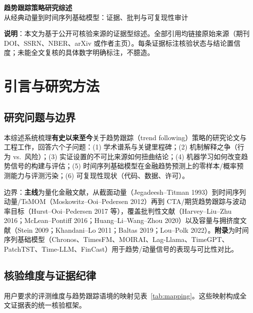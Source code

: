 \documentclass[11pt,a4paper]{article}
\begin{document}
\begin{center}
{\LARGE\bfseries 趋势跟踪策略研究综述\\[6pt]}
{\large 从经典动量到时间序列基础模型：证据、批判与可复现性审计}
\end{center}

\vspace{1em}
\noindent\textbf{说明}：本文为基于公开可核验来源的证据型综述。全部引用均链接原始来源（期刊 DOI、SSRN、NBER、arXiv 或作者主页）。每条证据标注核验状态与结论置信度；未能全文复核的具体数字明确标注，不臆造。

\tableofcontents

\section{引言与研究方法}

\subsection{研究问题与边界}
本综述系统梳理\textbf{有史以来至今}关于趋势跟踪（trend following）策略的研究论文与工程工作，回答六个子问题：(1) 学术谱系与关键里程碑；(2) 机制解释之争（行为 vs.\ 风险）；(3) 实证设置的不可比来源如何扭曲结论；(4) 机器学习如何改变趋势信号的构建与评估；(5) 时间序列基础模型在金融趋势预测上的零样本/概率预测能力与评测污染；(6) 可复现性现状（代码、数据、许可）。

边界：\textbf{主线}为量化金融文献，从截面动量（Jegadeesh--Titman 1993）到时间序列动量/TsMOM（Moskowitz--Ooi--Pedersen 2012）再到 CTA/期货趋势跟踪与波动率目标（Hurst--Ooi--Pedersen 2017 等），覆盖批判性文献（Harvey--Liu--Zhu 2016；McLean--Pontiff 2016；Huang--Li--Wang--Zhou 2020）以及容量与拥挤度文献（Stein 2009；Khandani--Lo 2011；Baltas 2019；Lou--Polk 2022）。\textbf{附录}为时间序列基础模型（Chronos、TimesFM、MOIRAI、Lag-Llama、TimeGPT、PatchTST、Time-LLM、FinCast）用于趋势/动量信号的表现与可比性对比。

\subsection{核验维度与证据纪律}
用户要求的评测维度与趋势跟踪语境的映射见表~\ref{tab:mapping}。这些映射构成全文证据表的统一核验框架。
\end{document}
